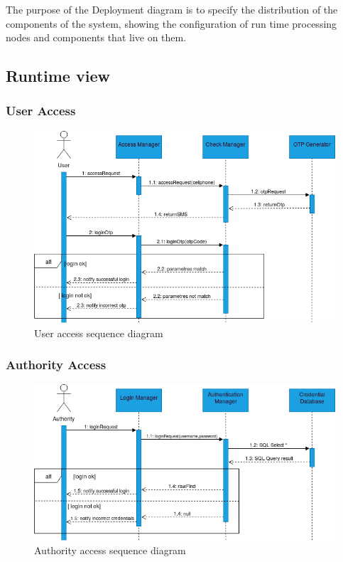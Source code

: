 	The purpose of the Deployment diagram is to specify the distribution of the components of the system, showing the configuration of run time processing nodes and components that live on them. 

\newpage

\subsection{Runtime view}
\subsubsection{User Access}
	\begin{figure}[H]
		\includegraphics[width=\textwidth]{Images/RunTimeViewUserAccess.png}		
		\caption{\label{fig:UserAccess}User access sequence diagram}
	\end{figure}
\subsubsection{Authority Access}
	\begin{figure}[H]
		\includegraphics[width=\textwidth]{Images/RunTimeViewAuthorityAccess.png}
		\caption{\label{fig:AuthorityAccess}Authority access sequence diagram}	
	\end{figure}
